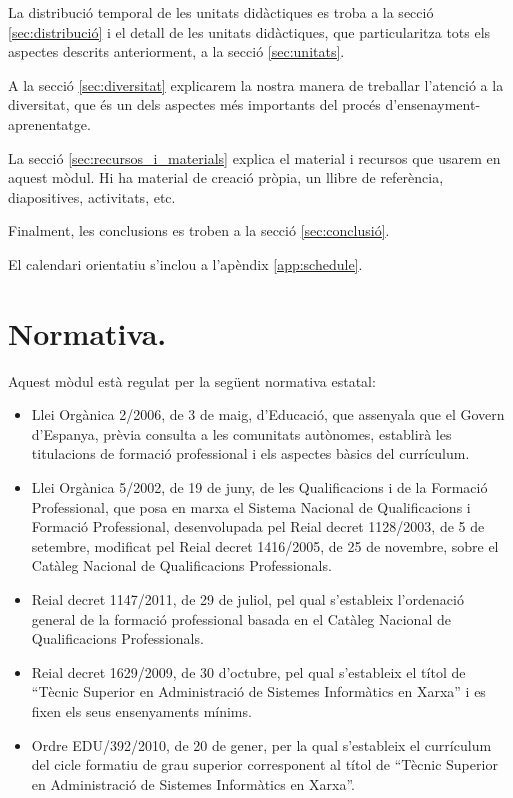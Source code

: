 \documentclass[catalan, a4paper, 12pt, titlepage]{article}
\begin{document}
La distribució temporal de les unitats didàctiques es troba a la secció \ref{sec:distribució} i el detall de les unitats didàctiques, que particularitza tots els aspectes descrits anteriorment, a la secció \ref{sec:unitats}.

A la secció \ref{sec:diversitat} explicarem la nostra manera de treballar l'atenció a la diversitat, que és un dels aspectes més importants del procés d'ensenayment-aprenentatge.

La secció \ref{sec:recursos_i_materials} explica el material i recursos que usarem en aquest mòdul.
Hi ha material de creació pròpia, un llibre de referència, diapositives, activitats, etc.

Finalment, les conclusions es troben a la secció \ref{sec:conclusió}.

El calendari orientatiu s'inclou a l'apèndix \ref{app:schedule}.

\section{Normativa.}
\label{sec:normativa}

Aquest mòdul està regulat per la següent normativa estatal:
\begin{itemize}
	\item Llei Orgànica 2/2006, de 3 de maig, d'Educació, que assenyala que el Govern d'Espanya, prèvia consulta a les comunitats autònomes, establirà les titulacions de formació professional i els aspectes bàsics del currículum.
	\item Llei Orgànica 5/2002, de 19 de juny, de les Qualificacions i de la Formació Professional, que posa en marxa el Sistema Nacional de Qualificacions i Formació Professional, desenvolupada pel Reial decret 1128/2003, de 5 de setembre, modificat pel Reial decret 1416/2005, de 25 de novembre, sobre el Catàleg Nacional de Qualificacions Professionals.
	\item Reial decret 1147/2011, de 29 de juliol, pel qual s'estableix l'ordenació general de la formació professional basada en el Catàleg Nacional de Qualificacions Professionals.
	\item Reial decret 1629/2009, de 30 d'octubre, pel qual s'estableix el títol de ``Tècnic Superior en Administració de Sistemes Informàtics en Xarxa'' i es fixen els seus ensenyaments mínims.
	\item Ordre EDU/392/2010, de 20 de gener, per la qual s'estableix el currículum del cicle formatiu de grau superior corresponent al títol de ``Tècnic Superior en Administració de Sistemes Informàtics en Xarxa''.
\end{itemize}
\end{document}
